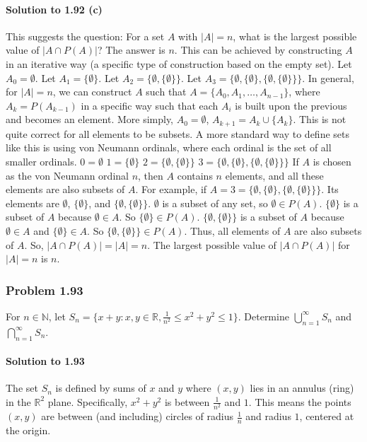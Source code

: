 \documentclass{article}
\begin{document}
\begin{itemize}
\begin{itemize}
\begin{itemize}
\paragraph*{Solution to 1.92 (c)}
This suggests the question: For a set $A$ with $|A|=n$, what is the largest possible value of $|A \cap P(A)|$?
The answer is $n$.
This can be achieved by constructing $A$ in an iterative way (a specific type of construction based on the empty set).
Let $A_0 = \emptyset$.
Let $A_1 = \{\emptyset\}$.
Let $A_2 = \{\emptyset, \{\emptyset\}\}$.
Let $A_3 = \{\emptyset, \{\emptyset\}, \{\emptyset, \{\emptyset\}\}\}$.
In general, for $|A|=n$, we can construct $A$ such that $A = \{A_0, A_1, \dots, A_{n-1}\}$, where $A_k = P(A_{k-1})$ in a specific way such that each $A_i$ is built upon the previous and becomes an element.
More simply, $A_0 = \emptyset$, $A_{k+1} = A_k \cup \{A_k\}$. This is not quite correct for all elements to be subsets.
A more standard way to define sets like this is using von Neumann ordinals, where each ordinal is the set of all smaller ordinals.
$0 = \emptyset$
$1 = \{\emptyset\}$
$2 = \{\emptyset, \{\emptyset\}\}$
$3 = \{\emptyset, \{\emptyset\}, \{\emptyset, \{\emptyset\}\}\}$
If $A$ is chosen as the von Neumann ordinal $n$, then $A$ contains $n$ elements, and all these elements are also subsets of $A$.
For example, if $A = 3 = \{\emptyset, \{\emptyset\}, \{\emptyset, \{\emptyset\}\}\}$.
Its elements are $\emptyset$, $\{\emptyset\}$, and $\{\emptyset, \{\emptyset\}\}$.
$\emptyset$ is a subset of any set, so $\emptyset \in P(A)$.
$\{\emptyset\}$ is a subset of $A$ because $\emptyset \in A$. So $\{\emptyset\} \in P(A)$.
$\{\emptyset, \{\emptyset\}\}$ is a subset of $A$ because $\emptyset \in A$ and $\{\emptyset\} \in A$. So $\{\emptyset, \{\emptyset\}\} \in P(A)$.
Thus, all elements of $A$ are also subsets of $A$.
So, $|A \cap P(A)| = |A| = n$.
The largest possible value of $|A \cap P(A)|$ for $|A|=n$ is $n$.

\subsubsection*{Problem 1.93}
For $n \in \mathbb{N}$, let $S_n = \{x + y : x,y \in \mathbb{R}, \frac{1}{n^2} \le x^2 + y^2 \le 1\}$. Determine $\bigcup_{n=1}^\infty S_n$ and $\bigcap_{n=1}^\infty S_n$.

\paragraph*{Solution to 1.93}
The set $S_n$ is defined by sums of $x$ and $y$ where $(x,y)$ lies in an annulus (ring) in the $\mathbb{R}^2$ plane.
Specifically, $x^2 + y^2$ is between $\frac{1}{n^2}$ and $1$. This means the points $(x,y)$ are between (and including) circles of radius $\frac{1}{n}$ and radius $1$, centered at the origin.


\end{itemize}
\end{itemize}
\end{itemize}
\end{document}
